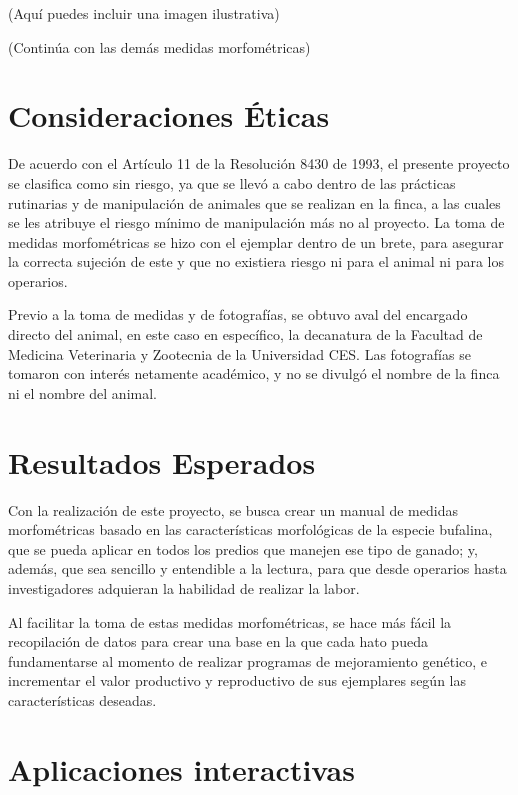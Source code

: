 \documentclass[
]{book}
\begin{document}
(Aquí puedes incluir una imagen ilustrativa)

(Continúa con las demás medidas morfométricas)

\chapter{Consideraciones Éticas}\label{consideraciones-uxe9ticas}

De acuerdo con el Artículo 11 de la Resolución 8430 de 1993, el presente proyecto se clasifica como sin riesgo, ya que se llevó a cabo dentro de las prácticas rutinarias y de manipulación de animales que se realizan en la finca, a las cuales se les atribuye el riesgo mínimo de manipulación más no al proyecto. La toma de medidas morfométricas se hizo con el ejemplar dentro de un brete, para asegurar la correcta sujeción de este y que no existiera riesgo ni para el animal ni para los operarios.

Previo a la toma de medidas y de fotografías, se obtuvo aval del encargado directo del animal, en este caso en específico, la decanatura de la Facultad de Medicina Veterinaria y Zootecnia de la Universidad CES. Las fotografías se tomaron con interés netamente académico, y no se divulgó el nombre de la finca ni el nombre del animal.

\chapter{Resultados Esperados}\label{resultados-esperados}

Con la realización de este proyecto, se busca crear un manual de medidas morfométricas basado en las características morfológicas de la especie bufalina, que se pueda aplicar en todos los predios que manejen ese tipo de ganado; y, además, que sea sencillo y entendible a la lectura, para que desde operarios hasta investigadores adquieran la habilidad de realizar la labor.

Al facilitar la toma de estas medidas morfométricas, se hace más fácil la recopilación de datos para crear una base en la que cada hato pueda fundamentarse al momento de realizar programas de mejoramiento genético, e incrementar el valor productivo y reproductivo de sus ejemplares según las características deseadas.

\chapter{Aplicaciones interactivas}\label{aplicaciones-interactivas}
\end{document}
